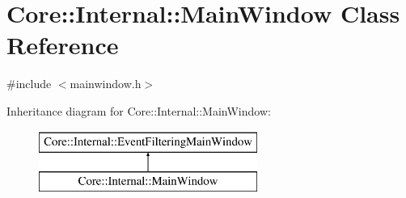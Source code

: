 \hypertarget{class_core_1_1_internal_1_1_main_window}{\section{\-Core\-:\-:\-Internal\-:\-:\-Main\-Window \-Class \-Reference}
\label{class_core_1_1_internal_1_1_main_window}
}


{\ttfamily \#include $<$mainwindow.\-h$>$}

\-Inheritance diagram for \-Core\-:\-:\-Internal\-:\-:\-Main\-Window\-:\begin{figure}[H]
\begin{center}
\leavevmode
\includegraphics[height=2.000000cm]{class_core_1_1_internal_1_1_main_window}
\end{center}
\end{figure}

